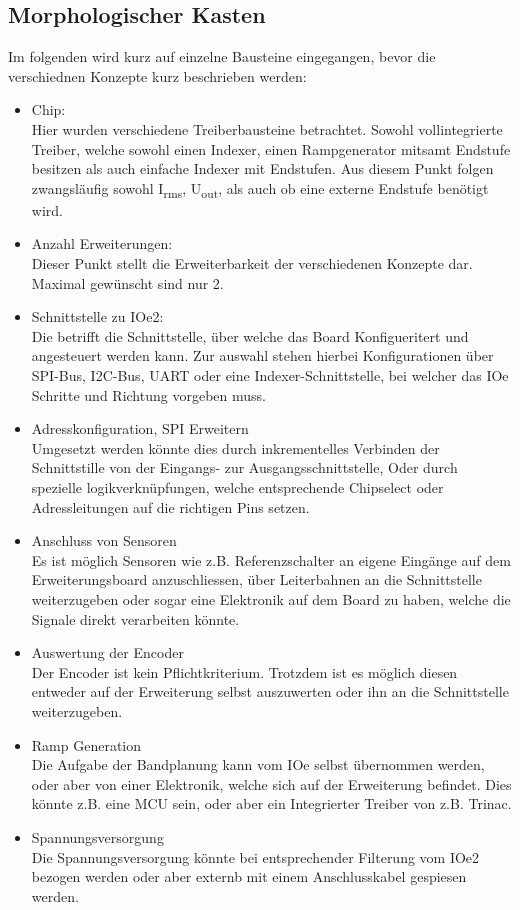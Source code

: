 \documentclass[]{article}
\begin{document}
\subsection{Morphologischer Kasten}

Im folgenden wird kurz auf einzelne Bausteine eingegangen, bevor die verschiednen Konzepte kurz beschrieben werden:

\begin{itemize}
    \item Chip:
        \\ Hier wurden verschiedene Treiberbausteine betrachtet. Sowohl vollintegrierte Treiber, welche
        sowohl einen Indexer, einen Rampgenerator mitsamt Endstufe besitzen als auch einfache Indexer mit
        Endstufen. Aus diesem Punkt folgen zwangsläufig sowohl I\textsubscript{rms}, U\textsubscript{out}, als auch ob
        eine externe Endstufe benötigt wird. 
    \item Anzahl Erweiterungen: 
        \\ Dieser Punkt stellt die Erweiterbarkeit der verschiedenen Konzepte dar. Maximal gewünscht sind
        nur 2. 
    \item Schnittstelle zu IOe2:
        \\ Die betrifft die Schnittstelle, über welche das Board Konfigueritert und angesteuert werden kann. Zur auswahl stehen hierbei 
        Konfigurationen über SPI-Bus, I2C-Bus, UART oder eine Indexer-Schnittstelle, bei welcher das IOe Schritte und Richtung vorgeben muss.
    \item Adresskonfiguration, SPI Erweitern
        \\ Umgesetzt werden könnte dies durch inkrementelles Verbinden der Schnittstille von der Eingangs- zur Ausgangsschnittstelle,
        Oder durch spezielle logikverknüpfungen, welche entsprechende Chipselect oder Adressleitungen auf die richtigen Pins setzen. 
    \item Anschluss von Sensoren
        \\ Es ist möglich Sensoren wie z.B. Referenzschalter an eigene Eingänge auf dem Erweiterungsboard anzuschliessen, über Leiterbahnen an 
        die Schnittstelle weiterzugeben oder sogar eine Elektronik auf dem Board zu haben, welche die Signale direkt verarbeiten könnte. 
    \item Auswertung der Encoder
        \\ Der Encoder ist kein Pflichtkriterium. Trotzdem ist es möglich diesen entweder auf der Erweiterung selbst auszuwerten oder ihn an die
        Schnittstelle weiterzugeben. 
    \item Ramp Generation
        \\ Die Aufgabe der Bandplanung kann vom IOe selbst übernommen werden, oder aber von einer Elektronik, welche sich auf der Erweiterung befindet.
        Dies könnte z.B. eine MCU sein, oder aber ein Integrierter Treiber von z.B. Trinac. 
    \item Spannungsversorgung
        \\ Die Spannungsversorgung könnte bei entsprechender Filterung vom IOe2 bezogen werden oder aber externb mit einem Anschlusskabel gespiesen werden.
\end{itemize}
\end{document}
